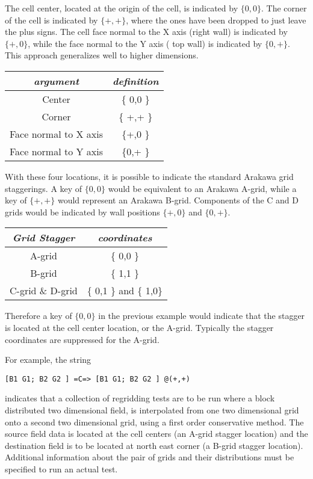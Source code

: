 The cell center, located at the origin of the cell, is indicated by $\{ 0,0 \}$. The corner of the cell is indicated by $\{ +,+ \}$, where the ones have been dropped to just leave the plus signs. The cell face normal to the X axis (right wall) is indicated by $\{ +, 0 \}$, while the face normal to the Y axis ( top wall) is indicated by $\{ 0,+ \}$. This approach generalizes well to higher dimensions. 
\begin{center}
\begin{tabular}{| c | c |} \hline 
{\em argument } & {\em definition} \\
\hline \hline
 Center & \{ 0,0 \}  \\
 Corner & \{ +,+ \} \\
 Face normal to X axis & \{+,0 \} \\
 Face normal to Y axis & \{0,+ \} \\
\hline 
\end{tabular}
\end{center}

With these four locations, it is possible to indicate the standard Arakawa grid staggerings. A key of $\{ 0,0 \}$ would be equivalent to an Arakawa A-grid, while a key of $\{ +,+ \}$ would represent an Arakawa B-grid. Components of the C and D grids would be indicated by wall positions $\{ +,0 \}$ and $\{ 0,+ \}$.
\begin{center}
\begin{tabular}{| c | c |} \hline 
{\em Grid Stagger } & {\em coordinates} \\
\hline \hline
  A-grid & \{ 0,0 \}  \\
  B-grid & \{ 1,1 \}  \\
  C-grid \& D-grid & \{ 0,1 \} and \{ 1,0\} \\
\hline 
\end{tabular}
\end{center}
Therefore a key of $\{ 0,0 \}$ in the previous example would indicate that the stagger is located at the cell center location, or the A-grid. Typically the stagger coordinates are suppressed for the A-grid. 

For example, the string
\begin{verbatim}
[B1 G1; B2 G2 ] =C=> [B1 G1; B2 G2 ] @(+,+)
\end{verbatim}
indicates that a collection of regridding tests are to be run where a block distributed two dimensional field, is interpolated from one two dimensional grid onto a second two dimensional grid, using a first order conservative method. The source field data is located at the cell centers (an A-grid stagger location) and the destination field is to be located at north east corner (a B-grid stagger location). Additional information about the pair of grids and their distributions must be specified to run an actual test. 

